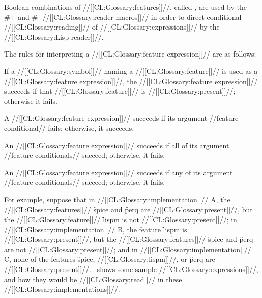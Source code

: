 Boolean combinations of //[[CL:Glossary:features]]//, called , are used by the \f{\#+} and \f{\#-} //[[CL:Glossary:reader macros]]// in order to direct conditional //[[CL:Glossary:reading]]// of //[[CL:Glossary:expressions]]// by the //[[CL:Glossary:Lisp reader]]//.

The rules for interpreting a //[[CL:Glossary:feature expression]]// are as follows:

\beginlist


If a //[[CL:Glossary:symbol]]// naming a //[[CL:Glossary:feature]]// is used as a //[[CL:Glossary:feature expression]]//, the //[[CL:Glossary:feature expression]]// succeeds if that //[[CL:Glossary:feature]]// is //[[CL:Glossary:present]]//; otherwise it fails.


A  //[[CL:Glossary:feature expression]]// succeeds  if its argument //feature-conditional// fails; otherwise, it succeeds.


An  //[[CL:Glossary:feature expression]]// succeeds  if all of its argument //feature-conditionals// succeed; otherwise, it fails.


An  //[[CL:Glossary:feature expression]]// succeeds  if any of its argument //feature-conditionals// succeed; otherwise, it fails.

\endlist

 

For example, suppose that
 in //[[CL:Glossary:implementation]]// A, the //[[CL:Glossary:features]]// \f{spice} and \f{perq} are //[[CL:Glossary:present]]//, 			     but the //[[CL:Glossary:feature]]// \f{lispm} is not //[[CL:Glossary:present]]//;
 in //[[CL:Glossary:implementation]]// B, the feature \f{lispm} is //[[CL:Glossary:present]]//, 			     but the //[[CL:Glossary:features]]// \f{spice} and \f{perq} are 			      not //[[CL:Glossary:present]]//;
 and 
 in //[[CL:Glossary:implementation]]// C, none of the features \f{spice}, //[[CL:Glossary:lispm]]//, or \f{perq} are 			     //[[CL:Glossary:present]]//. \Thenextfigure\ shows some sample //[[CL:Glossary:expressions]]//, and how they would be  //[[CL:Glossary:read]]// in these //[[CL:Glossary:implementations]]//.

